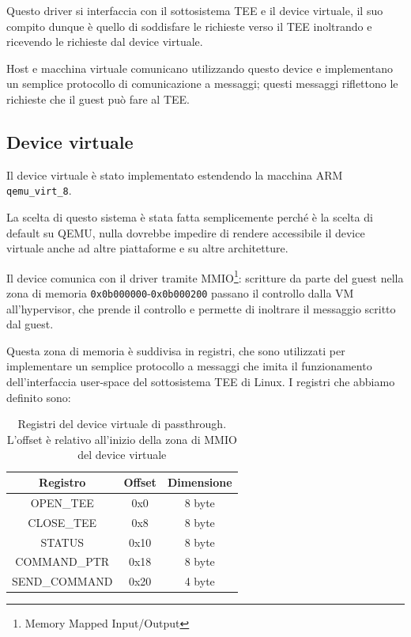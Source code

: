 \documentclass[12pt,italian]{report}
\begin{document}
Questo driver si interfaccia con il sottosistema TEE e il device virtuale,
il suo compito dunque è quello di soddisfare le richieste verso il TEE
inoltrando e ricevendo le richieste dal device virtuale.

Host e macchina virtuale comunicano utilizzando questo device e implementano
un semplice protocollo di comunicazione a messaggi; questi messaggi
riflettono le richieste che il guest può fare al TEE. 

\subsection{Device virtuale}
Il device virtuale è stato implementato estendendo la macchina ARM
\texttt{qemu\_virt\_8}. 

La scelta di questo sistema è stata fatta semplicemente perché è
la scelta di default su QEMU, nulla dovrebbe impedire di rendere
accessibile il device virtuale anche ad altre piattaforme e su altre
architetture.

\bigbreak \noindent

Il device comunica con il driver tramite MMIO\footnote{
    Memory Mapped Input/Output
}:
scritture da parte del guest nella zona di memoria
\texttt{0x0b000000}-\texttt{0x0b000200}
passano il controllo dalla VM all'hypervisor, che prende il controllo e
permette di inoltrare il messaggio scritto dal guest.

Questa zona di memoria è suddivisa in registri, che sono utilizzati
per implementare un semplice protocollo a messaggi che imita il funzionamento
dell'interfaccia user-space del sottosistema TEE di Linux.
I registri che abbiamo definito sono:

\begin{table}
    \centering
    \begin{tabular}{|c|c|c|}
        \hline
        \textbf{Registro}   & \textbf{Offset} & \textbf{Dimensione} \\
        \hline
        OPEN\_TEE           & 0x0             & 8 byte \\
        CLOSE\_TEE          & 0x8             & 8 byte \\
        STATUS              & 0x10            & 8 byte \\
        COMMAND\_PTR        & 0x18            & 8 byte \\
        SEND\_COMMAND       & 0x20            & 4 byte \\
        \hline
    \end{tabular}
    \caption{
        Registri del device virtuale di passthrough.
        L'offset è relativo all'inizio della zona di MMIO del device virtuale
    }
    \label{table:registri-device}
\end{table}
\end{document}
